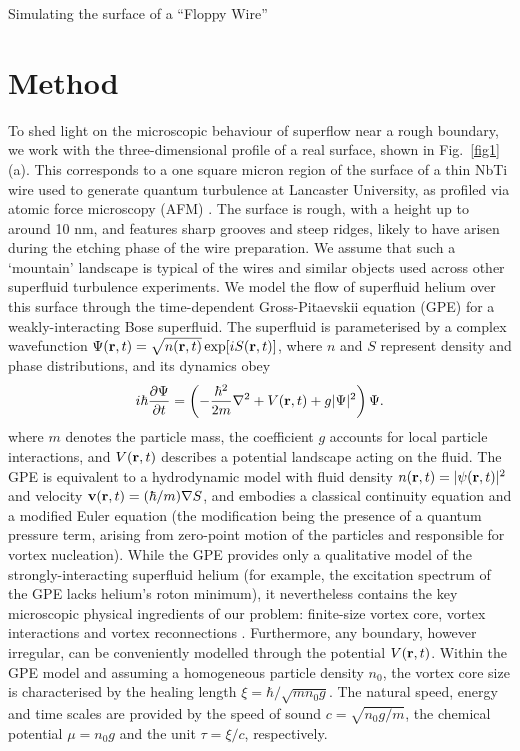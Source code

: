 \begin{chapter}{\label{cha:afm}Simulating the surface of a ``Floppy Wire''}
\section{Method}
To shed light on the microscopic behaviour of superflow near a rough
boundary, we work with the three-dimensional profile of a real surface, shown in Fig.~\ref{fig1}(a).  This corresponds to a one square micron region of the surface of a thin NbTi wire used to generate quantum turbulence at Lancaster University, as profiled via atomic force microscopy (AFM) \cite{Lawson}.  The surface is rough, with a height up to around 10 nm, and features sharp grooves and steep ridges, likely to have arisen during the etching phase of the wire preparation.    We assume that such a `mountain'  landscape is typical of the wires and similar objects used across other superfluid turbulence experiments.  We model the flow of
superfluid helium over this surface through the time-dependent Gross-Pitaevskii equation \cite{RobertsBerloff-GPE} (GPE) for a weakly-interacting Bose superfluid.  The superfluid is parameterised by a complex wavefunction $\Psi({\bf r},t)=\sqrt{n({\bf r},t)}\exp[i S({\bf r},t)]$, where $n$ and $S$ represent density and phase distributions, and its dynamics obey
\begin{equation}
i \hbar \frac{\partial\Psi}{\partial t} 
= \left(-\frac{\hbar^2}{2m}\nabla^2 + V({\bf r},t) + g|\Psi|^2 \right) \Psi.
\end{equation}
where $m$ denotes the particle mass, the coefficient $g$ accounts for local particle interactions, and $V({\bf r},t)$ describes a potential landscape acting on the fluid.  
The GPE is equivalent to a hydrodynamic model with fluid 
density $n({\bf r},t)=|\psi({\bf r},t)|^2$ and velocity 
${\bf v}({\bf r},t)=(\hbar/m)\nabla S$, and embodies a classical 
continuity equation and a modified Euler equation (the modification being 
the presence of a quantum pressure term, arising from zero-point motion 
of the particles {and responsible for vortex nucleation}).  
While the GPE provides only a qualitative model of the strongly-interacting superfluid helium (for example, the excitation spectrum of the GPE lacks helium's roton minimum), it nevertheless contains the key microscopic physical ingredients of our problem: finite-size vortex core, vortex interactions and vortex reconnections \cite{RobertsBerloff-GPE}.  Furthermore, any boundary, however irregular, can be conveniently
modelled through the potential $V({\bf r},t)$.  Within the GPE model and assuming a homogeneous particle density $n_0$, the vortex core size is characterised by the healing length $\xi=\hbar/\sqrt{m n_0 g}$.  The natural speed, energy and time scales are provided by the speed of sound $c=\sqrt{n_0 g/m}$, the chemical potential $\mu=n_0 g$ and the unit $\tau=\xi/c$, respectively.  


\end{chapter}
